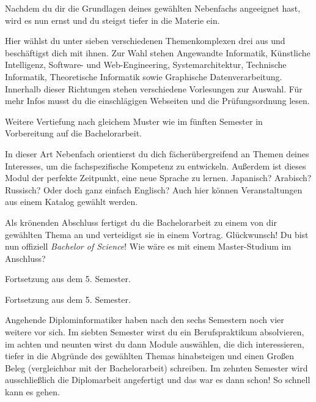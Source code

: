 Nachdem du dir die Grundlagen deines gewählten Nebenfachs angeeignet hast, wird es nun ernst und du steigst tiefer in die Materie ein.

Hier wählst du unter sieben verschiedenen Themenkomplexen drei aus und beschäftigst dich mit ihnen.
Zur Wahl stehen Angewandte Informatik, Künstliche Intelligenz, Software- und Web-Engineering, Systemarchitektur, Technische Informatik, Theoretische Informatik sowie Graphische Datenverarbeitung.
Innerhalb dieser Richtungen stehen verschiedene Vorlesungen zur Auswahl.
Für mehr Infos musst du die einschlägigen Webseiten und die Prüfungsordnung lesen.


Weitere Vertiefung nach gleichem Muster wie im fünften Semester in Vorbereitung auf die Bachelorarbeit.

In dieser Art Nebenfach orientierst du dich fächerübergreifend an Themen deines Interesses, um die fachspezifische Kompetenz zu entwickeln.
Außerdem ist dieses Modul der perfekte Zeitpunkt, eine neue Sprache zu lernen. Japanisch? Arabisch? Russisch? Oder doch ganz einfach Englisch?
Auch hier können Veranstaltungen aus einem Katalog gewählt werden.

Als krönenden Abschluss fertigst du die Bachelorarbeit zu einem von dir gewählten Thema an und verteidigst sie in einem Vortrag.
Glückwunsch! Du bist nun offiziell \textit{Bachelor of Science}! Wie wäre es mit einem Master-Studium im Anschluss?

Fortsetzung aus dem 5. Semester.

Fortsetzung aus dem 5. Semester.


Angehende Diplominformatiker haben nach den sechs Semestern noch vier weitere vor sich.
Im siebten Semester wirst du ein Berufspraktikum absolvieren, im achten und neunten wirst du dann Module auswählen, die dich interessieren, tiefer in die Abgründe des gewählten Themas hinabsteigen und einen \glqq{}Großen Beleg\grqq{} (vergleichbar mit der Bachelorarbeit) schreiben.
Im zehnten Semester wird ausschließlich die Diplomarbeit angefertigt und das war es dann schon!
So schnell kann es gehen.

